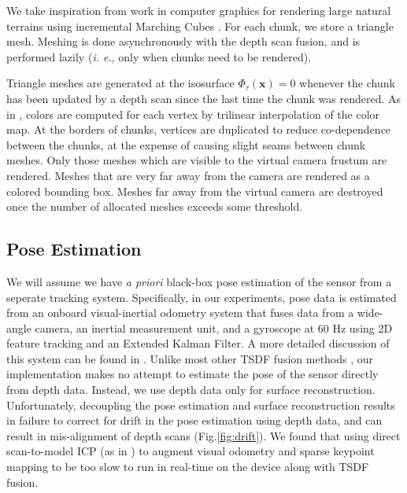 \documentclass[conference]{IEEEtran}
\newcommand{\figref}[1]{Fig.\ref{#1}}
\newcommand{\ie}{\textit{i. e.}}
\begin{document}
We take inspiration from work in computer graphics for rendering large
natural terrains \cite{GPUGEMS3} using incremental Marching Cubes
\cite{Lorensen1987}. For each chunk, we store a triangle mesh.
Meshing is done asynchronously with the depth scan fusion, and is
performed lazily (\ie, only when chunks need to be rendered).

Triangle meshes are generated at the isosurface
$\Phi_{\tau}(\mathbf{x}) = 0$ whenever the chunk has been updated by a depth
scan since the last time the chunk was rendered. As in \cite{Bylow2013,
Whelan2013},  colors are computed for each vertex by trilinear interpolation of
the color map. At the borders of chunks, vertices are duplicated to reduce
co-dependence between the chunks, at the expense of causing slight seams
between chunk meshes. Only those meshes which are visible to the virtual camera
frustum are rendered. Meshes that are very far away from the camera are
rendered as a colored bounding box. Meshes far away from the virtual camera are
destroyed once the number of allocated meshes exceeds some threshold.

\subsection{Pose Estimation}
\label{section:pose}
We will assume we  have \textit{a priori} black-box pose estimation of the
sensor from a seperate tracking system. Specifically, in our experiments, pose
data is estimated from an onboard visual-inertial odometry system that fuses
data from a wide-angle camera, an inertial measurement unit, and a gyroscope at
60 Hz using 2D feature tracking and an Extended Kalman Filter. A more detailed
discussion of this system can be found in \cite{VINS}.  Unlike
most other TSDF fusion methods \cite{Newcombe, Whelan2013,
Bylow2013, NiessnerHashing} , our implementation makes no attempt to estimate
the pose of the sensor directly from depth data. Instead, we use depth data 
only for surface reconstruction. Unfortunately, decoupling the pose estimation
and surface reconstruction results in failure to correct for drift in the pose
estimation using depth data, and can result in mis-alignment of depth scans
(\figref{fig:drift}). We found that using direct scan-to-model ICP (as in
\cite{Newcombe}) to augment visual odometry and sparse keypoint mapping to be
too slow to run in real-time on the device along with TSDF fusion.
\end{document}
